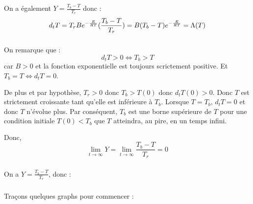 \documentclass[10pt,a4paper,twocolumn]{report}
\begin{document}
On a également $Y= \frac{T_b-T}{T_r}$ donc : 
$$ d_tT = T_r \space B e^{-\frac{E}{RT}} (\frac{T_b-T}{T_r}) = B \space (T_b-T) e^{-\frac{E}{RT}}  = \Lambda(T)$$

\subsubsection{} %

On remarque que : $$ d_tT > 0 \Leftrightarrow T_b > T $$ car $B>0$ et la fonction exponentielle est toujours scrictement positive. Et $T_b = T \Leftrightarrow d_t T = 0$.

De plus et par hypothèse, $T_r > 0$ donc $T_b > T(0)$ donc $d_t T(0) > 0$. Donc $T$ est strictement croissante tant qu'elle est inférieure à $T_b$. Lorsque $T = T_b$, $d_t T = 0$ et donc $T$ n'évolue plus. Par conséquent, $T_b$ est une borne supérieure de $T$ pour une condition initiale $T(0) < T_b$ que $T$ atteindra, au pire, en un temps infini.

Donc, 
$$\lim_{t \rightarrow \infty} Y = \lim_{t \rightarrow \infty} \frac{T_b-T}{T_r} = 0 $$

\subsubsection{} %

On a $Y= \frac{T_b-T}{T_r}$, donc :


\subsubsection{}%

Traçons quelques graphs pour commencer : 

\end{document}
